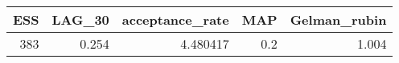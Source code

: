 \begin{longtable}{rrrrr}
\toprule
ESS & LAG\_30 & acceptance\_rate & MAP & Gelman\_rubin \\ 
\midrule
383 & 0.254 & 4.480417 & 0.2 & 1.004 \\ 
\bottomrule
\end{longtable}

